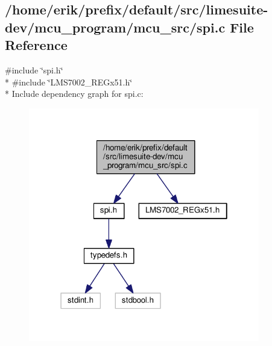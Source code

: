 \subsection{/home/erik/prefix/default/src/limesuite-\/dev/mcu\+\_\+program/mcu\+\_\+src/spi.c File Reference}
\label{spi_8c}
{\ttfamily \#include \char`\"{}spi.\+h\char`\"{}}\\*
{\ttfamily \#include \char`\"{}L\+M\+S7002\+\_\+\+R\+E\+Gx51.\+h\char`\"{}}\\*
Include dependency graph for spi.\+c\+:
\nopagebreak
\begin{figure}[H]
\begin{center}
\leavevmode
\includegraphics[width=286pt]{d0/d14/spi_8c__incl}
\end{center}
\end{figure}
